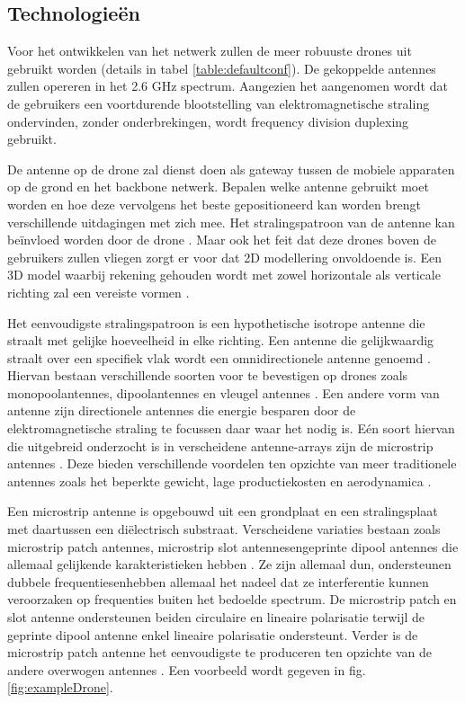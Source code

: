 \documentclass[twocolumn]{phdsymp_dutch}
\begin{document}
\subsection{Technologie\"en}
Voor het ontwikkelen van het netwerk zullen de meer robuuste drones uit \cite{J2} gebruikt worden (details in tabel \ref{table:defaultconf}). De 
gekoppelde antennes zullen opereren in het 2.6 GHz spectrum. Aangezien het aangenomen wordt dat de gebruikers een voortdurende blootstelling
van  elektromagnetische straling ondervinden, zonder onderbrekingen, wordt frequency division duplexing gebruikt. 

De antenne op de drone zal dienst doen als gateway tussen de mobiele apparaten op de grond en het backbone netwerk.
Bepalen welke antenne gebruikt moet worden en hoe deze vervolgens het beste gepositioneerd kan worden brengt 
verschillende uitdagingen met zich mee. Het stralingspatroon van de antenne kan be\"invloed worden door de drone \cite{A1}.
Maar ook het feit dat deze drones boven de gebruikers zullen vliegen zorgt er voor dat 2D modellering onvoldoende is.
Een 3D model waarbij rekening gehouden wordt met zowel horizontale als verticale richting zal een vereiste vormen \cite{U12}.

Het eenvoudigste stralingspatroon is een hypothetische isotrope antenne die straalt met gelijke hoeveelheid in elke richting.
Een antenne die gelijkwaardig straalt over een specifiek vlak wordt een omnidirectionele antenne genoemd 
\cite{U12}. Hiervan bestaan verschillende soorten voor te bevestigen op drones zoals monopoolantennes, dipoolantennes en vleugel antennes \cite{A4,A10,A11,A12}.
Een andere vorm van antenne zijn directionele antennes die energie besparen door de elektromagnetische straling 
te focussen daar waar het nodig is. Eén soort hiervan die uitgebreid onderzocht is in verscheidene antenne-arrays 
zijn de microstrip antennes \cite{A5,A6,A8}.
Deze bieden verschillende voordelen ten opzichte van meer traditionele antennes 
zoals het beperkte gewicht, lage productiekosten en aerodynamica \cite{J13_microstripadvantages,J14_antennadesign}.

Een microstrip antenne is opgebouwd uit een grondplaat en een stralingsplaat met daartussen een di\"electrisch substraat.
Verscheidene variaties bestaan zoals microstrip patch antennes, microstrip slot antennesengeprinte dipool antennes 
die allemaal gelijkende karakteristieken hebben \cite{J13_microstripadvantages,J14_antennadesign}. 
Ze zijn allemaal dun, ondersteunen dubbele frequentiesenhebben allemaal het nadeel dat 
ze interferentie kunnen veroorzaken op frequenties buiten het bedoelde spectrum. 
De microstrip patch en slot antenne ondersteunen beiden circulaire en lineaire polarisatie terwijl de geprinte dipool antenne enkel 
lineaire polarisatie ondersteunt. Verder is de microstrip patch antenne het eenvoudigste te produceren ten opzichte 
van de andere overwogen antennes \cite{J13_microstripadvantages}. Een voorbeeld wordt gegeven in fig. \ref{fig:exampleDrone}.
\end{document}
